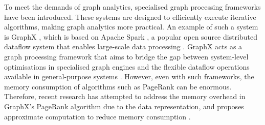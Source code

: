 \documentclass[a4paper,12pt]{article}
\begin{document}
To meet the demands of graph analytics, specialised graph processing frameworks have been introduced. These systems are designed to efficiently execute iterative algorithms, making graph analytics more practical. An example of such a system is GraphX \cite{xin_graphx_2013}, which is based on Apache Spark \cite{xin_graphx_2013}, a popular open source distributed dataflow system that enables large-scale data processing \cite{shanahan_large_2015}. GraphX acts as a graph processing framework that aims to bridge the gap between system-level optimisations in specialised graph engines and the flexible dataflow operations available in general-purpose systems \cite{jin_software_2022}. However, even with such frameworks, the memory consumption of algorithms such as PageRank can be enormous. Therefore, recent research has attempted to address the memory overhead in GraphX's PageRank algorithm due to the data representation, and proposes approximate computation to reduce memory consumption \cite{wu_efficient_2024}. 


 

\end{document}
